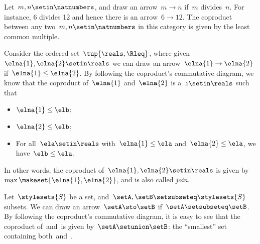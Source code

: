 \begin{example}
    Let~$m,n\setin \natnumbers$, and draw an arrow~$m\to n$ if~$m$ divides~$n$.
    For instance, 6 divides 12 and hence there is an arrow~$6\to 12$.
    The coproduct between any two~$m,n\setin \natnumbers$ in this category is given by the least common multiple.
\end{example}

\begin{example}
    Consider the ordered set~$\tup{\reals,\Rleq}$, where given~$\elna{1},\elna{2}\setin \reals$ we can draw an arrow~$\elna{1}\to \elna{2}$ if~$\elna{1}\leq \elna{2}$.
    By following the coproduct's commutative diagram, we know that the coproduct of~$\elna{1}$ and~$\elna{2}$ is a~$z\setin \reals$ such that
    \begin{itemize}
        \item $\elna{1}\leq \elb$;
        \item $\elna{2}\leq \elb$;
        \item For all~$\ela\setin \reals$ with~$\elna{1}\leq \ela$ and~$\elna{2}\leq \ela$, we have~$\elb\leq \ela$.
    \end{itemize}
    In other words, the coproduct of~$\elna{1},\elna{2}\setin \reals$ is given by~$\max\makeset{\elna{1},\elna{2}}$, and is also called \emph{join}.
\end{example}

\begin{example}
    \label{ex:subset_coprod}
    Let~$\stylesets{S}$ be a set, and~$\setA,\setB\setsubseteq \stylesets{S}$ subsets.
    We can draw an arrow~$\setA \sto \setB$ if~$\setA\setsubseteq \setB$.
    By following the coproduct's commutative diagram, it is easy to see that the coproduct of~\setA and~\setB is given by~$\setA\setunion\setB$: the ``smallest'' set containing both~\setA and~\setB.
\end{example}

